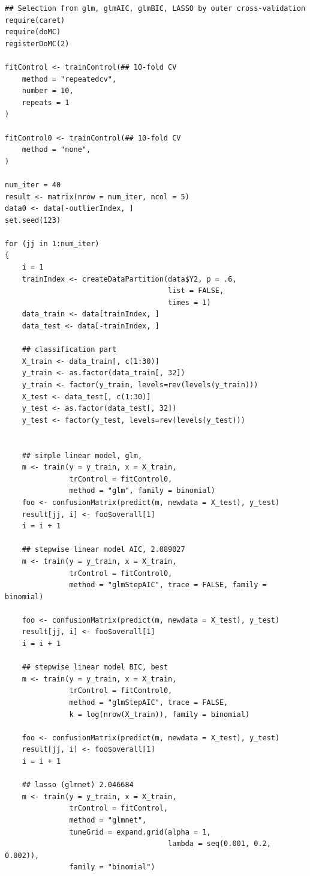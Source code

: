 \documentclass[11pt,oneside,a4paper]{article}
\begin{document}
\begin{verbatim}
## Selection from glm, glmAIC, glmBIC, LASSO by outer cross-validation
require(caret)
require(doMC)
registerDoMC(2)

fitControl <- trainControl(## 10-fold CV
    method = "repeatedcv",
    number = 10, 
    repeats = 1
)

fitControl0 <- trainControl(## 10-fold CV
    method = "none",
)

num_iter = 40
result <- matrix(nrow = num_iter, ncol = 5)
data0 <- data[-outlierIndex, ]
set.seed(123)

for (jj in 1:num_iter)
{
    i = 1
    trainIndex <- createDataPartition(data$Y2, p = .6,
                                      list = FALSE,
                                      times = 1)
    data_train <- data[trainIndex, ]
    data_test <- data[-trainIndex, ]
    
    ## classification part
    X_train <- data_train[, c(1:30)]
    y_train <- as.factor(data_train[, 32])
    y_train <- factor(y_train, levels=rev(levels(y_train)))
    X_test <- data_test[, c(1:30)]
    y_test <- as.factor(data_test[, 32])
    y_test <- factor(y_test, levels=rev(levels(y_test)))
    
    
    ## simple linear model, glm,
    m <- train(y = y_train, x = X_train,
               trControl = fitControl0,
               method = "glm", family = binomial)
    foo <- confusionMatrix(predict(m, newdata = X_test), y_test)
    result[jj, i] <- foo$overall[1]
    i = i + 1
    
    ## stepwise linear model AIC, 2.089027
    m <- train(y = y_train, x = X_train,
               trControl = fitControl0,
               method = "glmStepAIC", trace = FALSE, family = binomial)
    
    foo <- confusionMatrix(predict(m, newdata = X_test), y_test)
    result[jj, i] <- foo$overall[1]
    i = i + 1
    
    ## stepwise linear model BIC, best
    m <- train(y = y_train, x = X_train,
               trControl = fitControl0,
               method = "glmStepAIC", trace = FALSE, 
               k = log(nrow(X_train)), family = binomial)
    
    foo <- confusionMatrix(predict(m, newdata = X_test), y_test)
    result[jj, i] <- foo$overall[1]
    i = i + 1
    
    ## lasso (glmnet) 2.046684
    m <- train(y = y_train, x = X_train,
               trControl = fitControl,
               method = "glmnet", 
               tuneGrid = expand.grid(alpha = 1, 
                                      lambda = seq(0.001, 0.2, 0.002)), 
               family = "binomial")
    

\end{verbatim}
\end{document}
